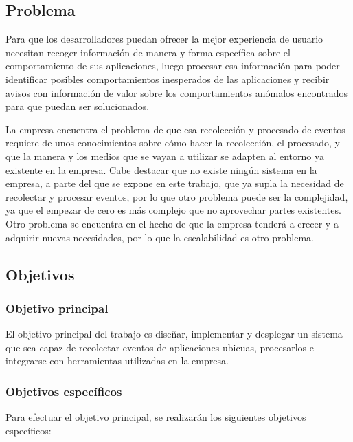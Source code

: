 \subsection{Problema}
Para que los desarrolladores puedan ofrecer la mejor experiencia de usuario necesitan recoger información de manera y forma específica sobre el comportamiento de sus aplicaciones, luego procesar esa información para poder identificar posibles comportamientos inesperados de las aplicaciones y recibir avisos con información de valor sobre los comportamientos anómalos encontrados para que puedan ser solucionados.

La empresa encuentra el problema de que esa recolección y procesado de eventos requiere de unos conocimientos sobre cómo hacer la recolección, el procesado, y que la manera y los medios que se vayan a utilizar se adapten al entorno ya existente en la empresa. Cabe destacar que no existe ningún sistema en la empresa, a parte del que se expone en este trabajo, que ya supla la necesidad de recolectar y procesar eventos, por lo que otro problema puede ser la complejidad, ya que el empezar de cero es más complejo que no aprovechar partes existentes. Otro problema se encuentra en el hecho de que la empresa tenderá a crecer y a adquirir nuevas necesidades, por lo que la escalabilidad es otro problema.

\subsection{Objetivos}
\subsubsection{Objetivo principal}
El objetivo principal del trabajo es diseñar, implementar y desplegar un sistema que sea capaz de recolectar eventos de aplicaciones ubicuas, procesarlos e integrarse con herramientas utilizadas en la empresa.


\subsubsection{Objetivos específicos}
Para efectuar el objetivo principal, se realizarán los siguientes objetivos específicos:

